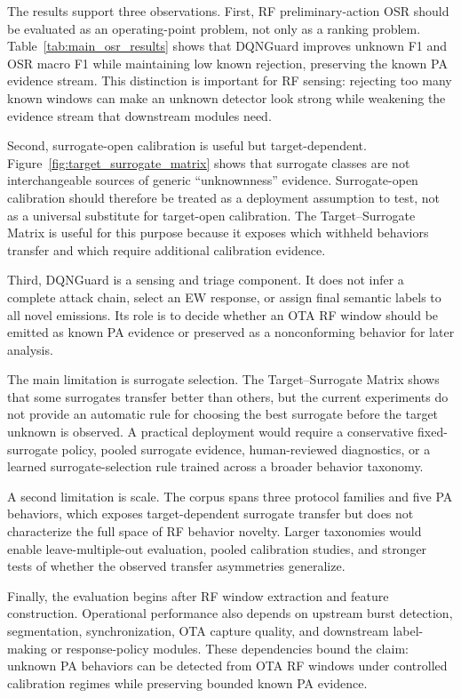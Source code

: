 The results support three observations. First, RF preliminary-action OSR should be evaluated as an operating-point problem, not only as a ranking problem. Table~\ref{tab:main_osr_results} shows that DQNGuard improves unknown F1 and OSR macro F1 while maintaining low known rejection, preserving the known PA evidence stream. This distinction is important for RF sensing: rejecting too many known windows can make an unknown detector look strong while weakening the evidence stream that downstream modules need.

Second, surrogate-open calibration is useful but target-dependent. Figure~\ref{fig:target_surrogate_matrix} shows that surrogate classes are not interchangeable sources of generic ``unknownness'' evidence. Surrogate-open calibration should therefore be treated as a deployment assumption to test, not as a universal substitute for target-open calibration. The Target--Surrogate Matrix is useful for this purpose because it exposes which withheld behaviors transfer and which require additional calibration evidence.

Third, DQNGuard is a sensing and triage component. It does not infer a complete attack chain, select an EW response, or assign final semantic labels to all novel emissions. Its role is to decide whether an OTA RF window should be emitted as known PA evidence or preserved as a nonconforming behavior for later analysis.

The main limitation is surrogate selection. The Target--Surrogate Matrix shows that some surrogates transfer better than others, but the current experiments do not provide an automatic rule for choosing the best surrogate before the target unknown is observed. A practical deployment would require a conservative fixed-surrogate policy, pooled surrogate evidence, human-reviewed diagnostics, or a learned surrogate-selection rule trained across a broader behavior taxonomy.

A second limitation is scale. The corpus spans three protocol families and five PA behaviors, which exposes target-dependent surrogate transfer but does not characterize the full space of RF behavior novelty. Larger taxonomies would enable leave-multiple-out evaluation, pooled calibration studies, and stronger tests of whether the observed transfer asymmetries generalize.

Finally, the evaluation begins after RF window extraction and feature construction. Operational performance also depends on upstream burst detection, segmentation, synchronization, OTA capture quality, and downstream label-making or response-policy modules. These dependencies bound the claim: unknown PA behaviors can be detected from OTA RF windows under controlled calibration regimes while preserving bounded known PA evidence.
